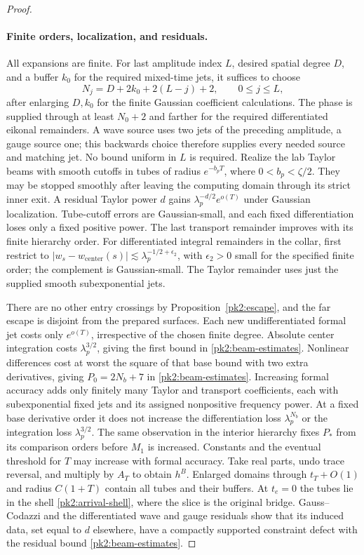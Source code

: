 \begin{proof}
\paragraph{Finite orders, localization, and residuals.}
All expansions are finite. For last amplitude index $L$, desired
spatial degree $D$, and a buffer $k_0$ for the required mixed-time jets,
it suffices to choose
\[
 N_j=D+2k_0+2(L-j)+2,\qquad 0\le j\le L,
\]
after enlarging $D,k_0$ for the finite Gaussian coefficient calculations.
The phase is supplied through at least $N_0+2$ and farther for the
required differentiated eikonal remainders. A wave source uses two jets
of the preceding amplitude, a gauge source one; this backwards choice
therefore supplies every needed source and matching jet. No bound
uniform in $L$ is required. Realize the lab Taylor beams with smooth cutoffs
in tubes of radius $e^{-b_pT}$, where $0<b_p<\zeta/2$. They may
be stopped smoothly after leaving the computing domain through
its strict inner exit. A residual Taylor power $d$ gains
$\lambda_p^{-d/2}e^{o(T)}$ under Gaussian localization. Tube-cutoff
errors are Gaussian-small, and each fixed differentiation loses
only a fixed positive power. The last transport remainder improves
with its finite hierarchy order. For differentiated integral
remainders in the collar, first restrict to
$|w_s-w_{\mathrm{center}}(s)|\lesssim\lambda_p^{-1/2+\epsilon_2}$,
with $\epsilon_2>0$ small for the specified finite order; the
complement is Gaussian-small. The Taylor remainder uses just
the supplied smooth subexponential jets.

There are no other entry crossings by
Proposition~\ref{pk2:escape}, and the far escape is disjoint from
the prepared surfaces. Each new undifferentiated formal jet costs
only $e^{o(T)}$, irrespective of the chosen finite degree.
Absolute center integration costs $\lambda_p^{3/2}$, giving the
first bound in \eqref{pk2:beam-estimates}. Nonlinear differences
cost at worst the square of that base bound with two extra
derivatives, giving $P_0=2N_b+7$ in
\eqref{pk2:beam-estimates}.
Increasing formal accuracy adds only finitely many Taylor and
transport coefficients, each with subexponential fixed jets and
its assigned nonpositive frequency power. At a fixed base
derivative order it does not increase the differentiation loss
$\lambda_p^{N_b}$ or the integration loss $\lambda_p^{3/2}$.
The same observation in the interior hierarchy fixes $P_*$ from
its comparison orders before $M_1$ is increased. Constants and
the eventual threshold for $T$ may increase with formal accuracy.
Take real parts, undo trace reversal, and multiply by $A_T$ to
obtain $h^B$. Enlarged domains through $t_T+O(1)$ and radius
$C(1+T)$ contain all tubes and their buffers. At $t_e=0$ the tubes
lie in the shell \eqref{pk2:arrival-shell}, where the slice is the
original bridge. Gauss--Codazzi and the differentiated wave and
gauge residuals show that its induced data, set equal to $d$
elsewhere, have a compactly supported constraint defect with
the residual bound \eqref{pk2:beam-estimates}.
\end{proof}

